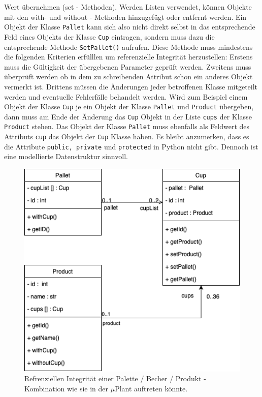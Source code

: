 Wert übernehmen (set - Methoden).
Werden Listen verwendet, können Objekte mit den with- und without - Methoden hinzugefügt oder entfernt werden.
Ein Objekt der Klasse \verb|Pallet| kann sich also nicht direkt selbst in das entsprechende Feld eines Objekts der Klasse
\verb|Cup| eintragen, sondern muss dazu die entsprechende Methode \verb|SetPallet()| aufrufen.
Diese Methode muss mindestens die folgenden Kriterien erfülllen um referenzielle Integrität herzustellen:
Erstens muss die Gültigkeit der übergebenen Parameter geprüft werden.
Zweitens muss überprüft werden ob in dem zu schreibenden Attribut schon ein anderes Objekt vermerkt ist.
Drittens müssen die Änderungen jeder betroffenen Klasse mitgeteilt werden und eventuelle Fehlerfälle behandelt werden.
Wird zum Beispiel einem Objekt der Klasse \verb|Cup| je ein Objekt der Klasse  \verb|Pallet| und \verb|Product|
übergeben, dann muss am Ende der Änderung das \verb|Cup| Objekt in der Liste \verb|cups| der Klasse \verb|Product| stehen.
Das Objekt der Klasse \verb|Pallet| muss ebenfalls als Feldwert des Attributs \verb|cup| das Objekt der \verb|Cup| Klasse haben.
Es bleibt anzumerken, dass es die Attribute \verb|public, private| und \verb|protected| in Python nicht gibt.
Dennoch ist eine modellierte Datenstruktur sinnvoll.\\

\vspace{1cm}
\begin{figure}
        \caption[Beispiel: Referenzielle Integrität]
        {\small Refrenziellen Integrität einer Palette / Becher / Produkt - Kombination wie sie in der $\mu$Plant
        auftreten könnte. }\label{fig:figure9}
        \includegraphics[width = \textwidth ]{Bilder/BeispielRefInt}
        \centering
\end{figure}

